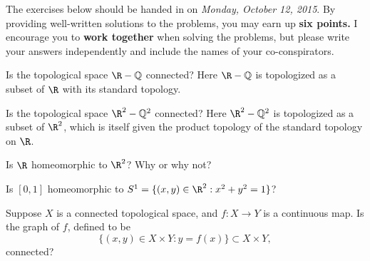 \documentclass[12pt]{pset}
\author{Jim Fowler}
\date{Autumn 2015}
\newcommand{\Q}{\mathbb{Q}}
\begin{document}
\maketitle

\noindent The exercises below should be handed in on \textit{Monday,
  October 12, 2015}.  By providing well-written solutions to the
problems, you may earn up \textbf{six points.}  I encourage you to
\textbf{work together} when solving the problems, but please write
your answers independently and include the names of your
co-conspirators.

\begin{problem}

  Is the topological space $\R - \Q$ connected?  Here $\R - \Q$ is
  topologized as a subset of $\R$ with its standard topology.

\end{problem}

\begin{problem}

  Is the topological space $\R^2 - \Q^2$ connected?  Here
  $\R^2 - \Q^2$ is topologized as a subset of $\R^2$, which is itself
  given the product topology of the standard topology on $\R$.

\end{problem}

\begin{problem}

  Is $\R$ homeomorphic to $\R^2$?  Why or why not?

\end{problem}

\begin{problem}

  Is $[0,1]$ homeomorphic to $S^1 = \{ (x,y) \in \R^2 : x^2 + y^2 = 1 \}$?

\end{problem}

\begin{problem}[Graphs]

  Suppose $X$ is a connected topological space, and $f : X \to Y$ is a
  continuous map.  Is the graph of $f$, defined to be
  \[
  \{ (x,y) \in X \times Y : y = f(x) \} \subset X \times Y,
  \]
  connected?

\end{problem}
\end{document}

